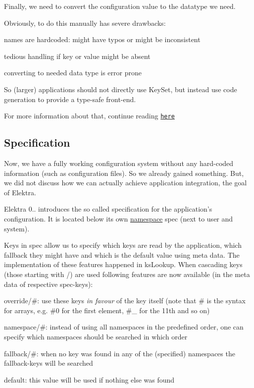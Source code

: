 Finally, we need to convert the configuration value to the datatype we need.

Obviously, to do this manually has severe drawbacks\+:


\begin{DoxyItemize}
\item names are hardcoded\+: might have typos or might be inconsistent
\item tedious handling if key or value might be absent
\item converting to needed data type is error prone
\end{DoxyItemize}

So (larger) applications should not directly use {\ttfamily Key\+Set}, but instead use code generation to provide a type-\/safe front-\/end.

For more information about that, continue reading \href{https://github.com/ElektraInitiative/libelektra/tree/master/src/tools/gen}{\tt here}

\subsection*{Specification}

Now, we have a fully working configuration system without any hard-\/coded information (such as configuration files). So we already gained something. But, we did not discuss how we can actually achieve application integration, the goal of Elektra.

Elektra 0.. introduces the so called specification for the application's configuration. It is located below its own \hyperlink{md_doc_help_elektra-namespaces_doc_help_elektra-namespaces_md}{namespace} {\ttfamily spec} (next to user and system).

Keys in {\ttfamily spec} allow us to specify which keys are read by the application, which fallback they might have and which is the default value using meta data. The implementation of these features happened in {\ttfamily ks\+Lookup}. When cascading keys (those starting with {\ttfamily /}) are used following features are now available (in the meta data of respective {\ttfamily spec}-\/keys)\+:


\begin{DoxyItemize}
\item {\ttfamily override/\#}\+: use these keys {\itshape in favour} of the key itself (note that {\ttfamily \#} is the syntax for arrays, e.\+g. {\ttfamily \#0} for the first element, {\ttfamily \#\+\_} for the 11th and so on)
\item {\ttfamily namespace/\#}\+: instead of using all namespaces in the predefined order, one can specify which namespaces should be searched in which order
\item {\ttfamily fallback/\#}\+: when no key was found in any of the (specified) namespaces the {\ttfamily fallback}-\/keys will be searched
\item {\ttfamily default}\+: this value will be used if nothing else was found
\end{DoxyItemize}

